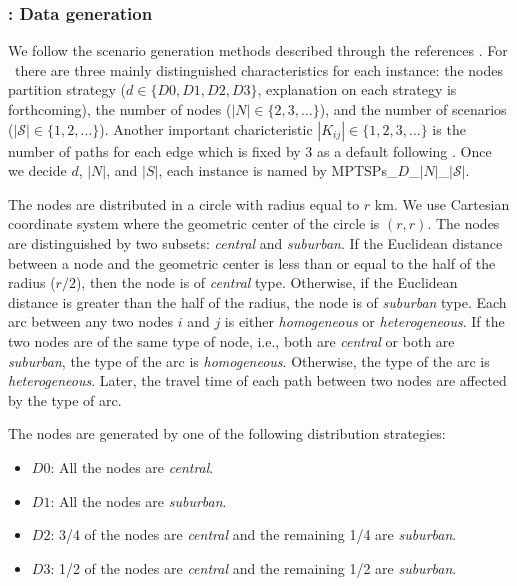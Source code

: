 \subsubsection{\mptsps: Data generation} \label{mptsps:datagen}
We follow the scenario generation methods described through the references \cite{journal:MPT2014,journal:PGM2017,journal:TPP2017}. For \mptsps\, there are three mainly distinguished characteristics for each instance: the nodes partition strategy ($d\in\{D0,D1,D2,D3\}$, explanation on each strategy is forthcoming), the number of nodes ($|N|\in\{2,3,\ldots\}$), and the number of scenarios ($|\mathcal{S}|\in\{1,2,\ldots\}$). Another important charicteristic $|K_{ij}|\in\{1,2,3,\ldots\}$ is the number of paths for each edge which is fixed by 3 as a default following \cite{journal:TPP2017}. Once we decide $d$, $|N|$, and $|S|$, each instance is named by MPTSPs\_$D$\_$|N|$\_$|\mathcal{S}|$.

The nodes are distributed in a circle with radius equal to $r$ km. We use Cartesian coordinate system where the geometric center of the circle is $(r,r)$. The nodes are distinguished by two subsets: \textit{central} and \textit{suburban}. If the Euclidean distance between a node and the geometric center is less than or equal to the half of the radius ($r/2$), then the node is of \textit{central} type. Otherwise, if the Euclidean distance is greater than the half of the radius, the node is of \textit{suburban} type. Each arc between any two nodes $i$ and $j$ is either \textit{homogeneous} or \textit{heterogeneous}. If the two nodes are of the same type of node, i.e., both are \textit{central} or both are \textit{suburban}, the type of the arc is \textit{homogeneous}. Otherwise, the type of the arc is \textit{heterogeneous}. Later, the travel time of each path between two nodes are affected by the type of arc. 

The nodes are generated by one of the following distribution strategies:
\begin{itemize}
	\item $D0$: All the nodes are \textit{central}.
	\item $D1$: All the nodes are \textit{suburban}.
	\item $D2$: 3/4 of the nodes are \textit{central} and the remaining 1/4 are \textit{suburban}.
	\item $D3$: 1/2 of the nodes are \textit{central} and the remaining 1/2 are \textit{suburban}.
\end{itemize}

